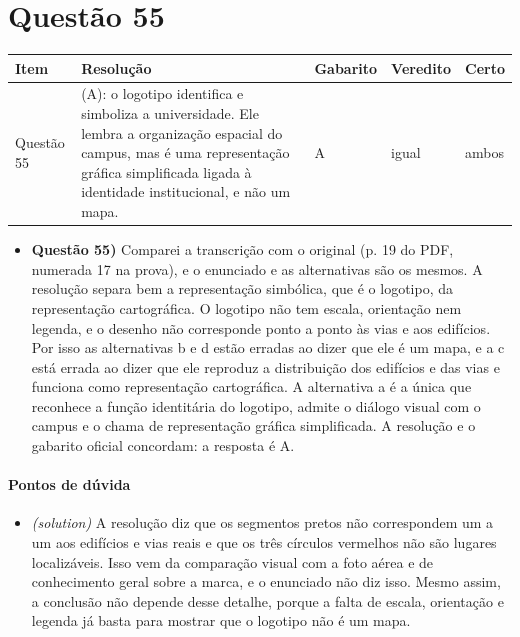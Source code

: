 \documentclass{article}%
\begin{document}
\section*{Questão 55}%
\begin{longtable}{@{}p{} p{} p{} p{} p{}@{}}\toprule Item & Resolução & Gabarito & Veredito & Certo \\ \midrule
Questão 55 & (A): o logotipo identifica e simboliza a universidade. Ele lembra a organização espacial do campus, mas é uma representação gráfica simplificada ligada à identidade institucional, e não um mapa. & A & igual & ambos \\
\bottomrule\end{longtable}%
\begin{itemize}%
\item%
\textbf{Questão 55)} Comparei a transcrição com o original (p. 19 do PDF, numerada 17 na prova), e o enunciado e as alternativas são os mesmos. A resolução separa bem a representação simbólica, que é o logotipo, da representação cartográfica. O logotipo não tem escala, orientação nem legenda, e o desenho não corresponde ponto a ponto às vias e aos edifícios. Por isso as alternativas b e d estão erradas ao dizer que ele é um mapa, e a c está errada ao dizer que ele reproduz a distribuição dos edifícios e das vias e funciona como representação cartográfica. A alternativa a é a única que reconhece a função identitária do logotipo, admite o diálogo visual com o campus e o chama de representação gráfica simplificada. A resolução e o gabarito oficial concordam: a resposta é A.%
\end{itemize}%
\paragraph{Pontos de dúvida}%
\begin{itemize}%
\item%
\textit{(solution)} A resolução diz que os segmentos pretos não correspondem um a um aos edifícios e vias reais e que os três círculos vermelhos não são lugares localizáveis. Isso vem da comparação visual com a foto aérea e de conhecimento geral sobre a marca, e o enunciado não diz isso. Mesmo assim, a conclusão não depende desse detalhe, porque a falta de escala, orientação e legenda já basta para mostrar que o logotipo não é um mapa.%
\end{itemize}%
\end{document}
